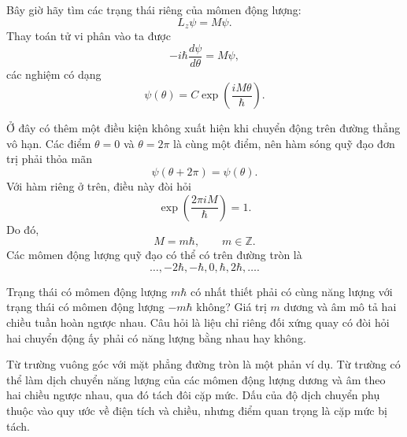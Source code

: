 Bây giờ hãy tìm các trạng thái riêng của mômen động lượng:
\begin{equation}
L_z\psi=M\psi.
\end{equation}
Thay toán tử vi phân vào ta được
\begin{equation}
-i\hbar\frac{d\psi}{d\theta}=M\psi,
\end{equation}
các nghiệm có dạng
\begin{equation}
\psi(\theta)=C\exp\left(\frac{iM\theta}{\hbar}\right).
\end{equation}

Ở đây có thêm một điều kiện không xuất hiện khi chuyển động trên đường thẳng vô hạn. Các điểm \(\theta=0\) và \(\theta=2\pi\) là cùng một điểm, nên hàm sóng quỹ đạo đơn trị phải thỏa mãn
\begin{equation}
\psi(\theta+2\pi)=\psi(\theta).
\end{equation}
Với hàm riêng ở trên, điều này đòi hỏi
\begin{equation}
\exp\left(\frac{2\pi iM}{\hbar}\right)=1.
\end{equation}
Do đó,
\begin{equation}
M=m\hbar,
\qquad
m\in\mathbb Z.
\end{equation}
Các mômen động lượng quỹ đạo có thể có trên đường tròn là
\begin{equation}
\ldots,-2\hbar,-\hbar,0,\hbar,2\hbar,\ldots.
\end{equation}

Trạng thái có mômen động lượng \(m\hbar\) có nhất thiết phải có cùng năng lượng với trạng thái có mômen động lượng \(-m\hbar\) không? Giá trị \(m\) dương và âm mô tả hai chiều tuần hoàn ngược nhau. Câu hỏi là liệu chỉ riêng đối xứng quay có đòi hỏi hai chuyển động ấy phải có năng lượng bằng nhau hay không.

\begin{classroomqa}
\end{classroomqa}

Từ trường vuông góc với mặt phẳng đường tròn là một phản ví dụ. Từ trường có thể làm dịch chuyển năng lượng của các mômen động lượng dương và âm theo hai chiều ngược nhau, qua đó tách đôi cặp mức. Dấu của độ dịch chuyển phụ thuộc vào quy ước về điện tích và chiều, nhưng điểm quan trọng là cặp mức bị tách.

